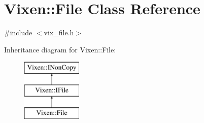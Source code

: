 \hypertarget{classVixen_1_1File}{}\section{Vixen\+:\+:File Class Reference}
\label{classVixen_1_1File}


{\ttfamily \#include $<$vix\+\_\+file.\+h$>$}

Inheritance diagram for Vixen\+:\+:File\+:\begin{figure}[H]
\begin{center}
\leavevmode
\includegraphics[height=3.000000cm]{classVixen_1_1File}
\end{center}
\end{figure}
